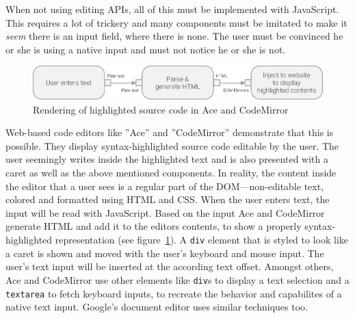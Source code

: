 When not using editing APIs, all of this must be implemented with JavaScript. This requires a lot of trickery and many components must be imitated to make it \textit{seem} there is an input field, where there is none. The user must be convinced he or she is using a native input and must not notice he or she is not.

\begin{figure}[!htb]
\centering
\includegraphics[scale=.7]{./images/ace-codemirror-uml.eps}
\caption{Rendering of highlighted source code in Ace and CodeMirror}
\label{fig:ace_rendering_uml}
\end{figure}


Web-based code editors like ''Ace'' and ''CodeMirror'' demonstrate that this is possible. They display syntax-highlighted source code editable by the user. The user seemingly writes inside the highlighted text and is also presented with a caret as well as the above mentioned components. In reality, the content inside the editor that a user sees is a regular part of the DOM---non-editable text, colored and formatted using HTML and CSS. When the user enters text, the input will be read with JavaScript. Based on the input Ace and CodeMirror generate HTML and add it to the editors contents, to show a properly syntax-highlighted representation (see figure~\ref{fig:ace_rendering_uml}). A \texttt{div} element that is styled to look like a caret is shown and moved with the user's keyboard and mouse input. The user's text input will be inserted at the according text offset. Amongst others, Ace and CodeMirror use other elements like \texttt{div}s to display a text selection and a \texttt{textarea} to fetch keyboard inputs, to recreate the behavior and capabilites of a native text input. Google's document editor uses similar techniques too.




